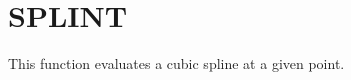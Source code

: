 \section{SPLINT}
\label{sect:splint}

\noindent This function evaluates a cubic spline at a given point.\\
